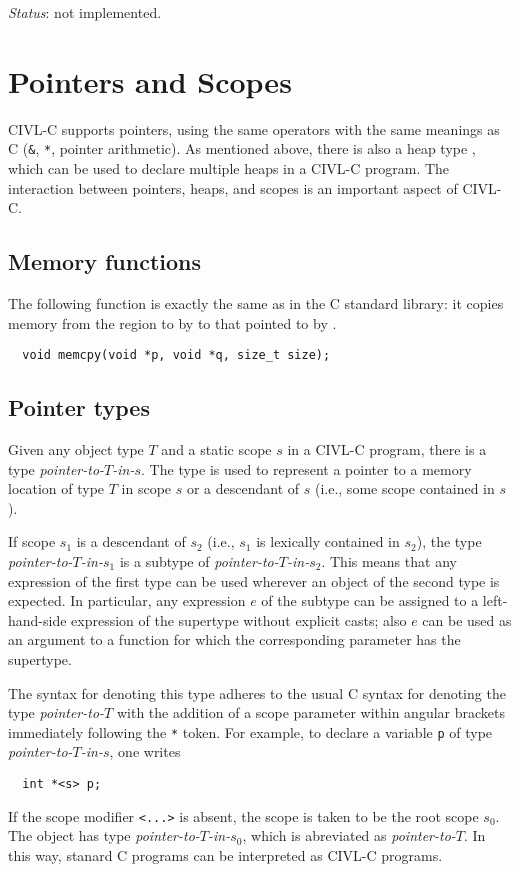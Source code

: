 \emph{Status}: not implemented.

\chapter{Pointers and Scopes}
\label{chap:pointers}

CIVL-C supports pointers, using the same operators with the same
meanings as C (\texttt{\&}, \texttt{*}, pointer arithmetic).
As mentioned above, there is also a heap type \cheap{}, which can
be used to declare multiple heaps in a CIVL-C program.  The
interaction between pointers, heaps, and scopes is an important
aspect of CIVL-C.

\section{Memory functions}

The following function is exactly the same as in the C standard
library: it copies memory from the region to by  to that pointed
to by .

\begin{verbatim}
  void memcpy(void *p, void *q, size_t size);
\end{verbatim}

\section{Pointer types}

Given any object type $T$ and a static scope $s$ in a CIVL-C program,
there is a type \emph{pointer-to-$T$-in-$s$}.  The type is used to
represent a pointer to a memory location of type $T$ in scope $s$ or a
descendant of $s$ (i.e., some scope contained in $s$).

If scope $s_1$ is a descendant of $s_2$ (i.e., $s_1$ is lexically
contained in $s_2$), the type \emph{pointer-to-$T$-in-$s_1$} is a
subtype of \emph{pointer-to-$T$-in-$s_2$}.  This means that any
expression of the first type can be used wherever an object of the
second type is expected.  In particular, any expression $e$ of the
subtype can be assigned to a left-hand-side expression of the
supertype without explicit casts; also $e$ can be used as an argument
to a function for which the corresponding parameter has the supertype.

The syntax for denoting this type adheres to the usual C syntax for
denoting the type \emph{pointer-to-$T$} with the addition of a scope
parameter within angular brackets immediately following the \texttt{*}
token.  For example, to declare a variable \texttt{p} of type
\emph{pointer-to-$T$-in-$s$}, one writes
\begin{verbatim}
  int *<s> p;
\end{verbatim}
If the scope modifier \texttt{<...>} is absent, the scope is taken to
be the root scope $s_0$.  The object has type
\emph{pointer-to-$T$-in-$s_0$}, which is abreviated as
\emph{pointer-to-$T$}.  In this way, stanard C programs can be
interpreted as CIVL-C programs.

